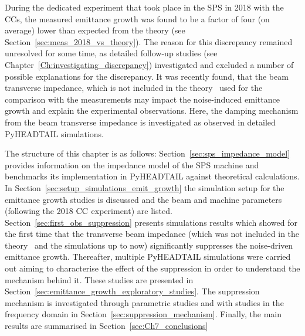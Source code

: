 During the dedicated experiment that took place in the SPS
in 2018 with the CCs, the measured emittance
growth was found to be a factor of four (on average) lower than
expected from the theory (see Section~\ref{sec:meas_2018_vs_theory}). The reason for this discrepancy remained unresolved for some time, as detailed follow-up studies (see Chapter~\ref{Ch:investigating_discrepancy}) investigated and excluded a number of possible explanations for the discrepancy.
It was recently found, that the beam transverse impedance, which is not included in the theory~\cite{PhysRevSTAB.18.101001} used for the comparison with the measurements may impact the noise-induced emittance growth and explain the experimental observations. Here, the damping mechanism from the beam transverse impedance is investigated as observed in detailed PyHEADTAIL simulations.

The structure of this chapter is as follows: Section~\ref{sec:sps_impedance_model} provides information on the impedance model of the SPS machine and benchmarks its implementation in PyHEADTAIL against theoretical calculations. In Section~\ref{sec:setup_simulations_emit_growth} the simulation setup for the emittance growth studies is discussed and the beam and machine parameters (following the 2018 ${\mathrm{CC}}$ experiment) are listed. Section~\ref{sec:first_obs_suppression} presents simulations results which showed for the first time that the transverse beam impedance (which was not included in the theory~\cite{PhysRevSTAB.18.101001} and the simulations up to now) significantly suppresses the noise-driven emittance growth. Thereafter, multiple PyHEADTAIL simulations were carried out aiming to characterise the effect of the suppression in order to understand the mechanism behind it. These studies are presented in Section~\ref{sec:emittance_growth_exploratory_studies}. The suppression mechanism is investigated through parametric studies and with studies in the frequency domain in Section~\ref{sec:suppression_mechanism}. Finally, the main results are summarised in Section~\ref{sec:Ch7_conclusions}


